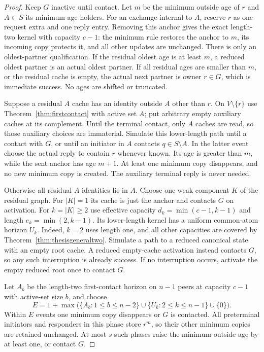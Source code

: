 \documentclass[11pt]{article}
\begin{document}
\begin{proof}
Keep $G$ inactive until contact. Let $m$ be the minimum
outside age of $r$ and $A\subset S$ its minimum-age holders.
For an exchange internal to $A$, reserve $r$ as one
request extra and one reply entry. Removing this anchor
gives the exact length-two kernel with capacity $c-1$:
the minimum rule restores the anchor to $m$, its incoming
copy protects it, and all other updates are unchanged.
There is only an oldest-partner qualification. If the
residual oldest age is at least $m$, a reduced oldest
partner is an actual oldest partner. If all residual
ages are smaller than $m$, or the residual cache is
empty, the actual next partner is owner $r\in G$,
which is immediate success. No ages are shifted or truncated.

Suppose a residual $A$ cache has an identity outside $A$
other than $r$. On $V\setminus\{r\}$ use
Theorem~\ref{thm:firstcontact} with active set $A$;
put arbitrary empty auxiliary caches at its complement.
Until the terminal contact, only $A$ caches are read,
so those auxiliary choices are immaterial. Simulate
this lower-length path until a contact with $G$, or
until an initiator in $A$ contacts $q\in S\setminus A$.
In the latter event choose the actual reply to contain
$r$ whenever known. Its age is greater than $m$, while
the sent anchor has age $m+1$. At least one minimum
copy disappears, and no new minimum copy is created.
The auxiliary terminal reply is never needed.

Otherwise all residual $A$ identities lie in $A$.
Choose one weak component $K$ of the residual graph.
For $|K|=1$ its cache is just the anchor and contacts
$G$ on activation. For $k=|K|\ge2$ use effective
capacity $d_k=\min(c-1,k-1)$ and length
$e_k=\min(2,k-1)$. Its lower-length kernel has a
uniform common-atom horizon $U_k$. Indeed, $k=2$
uses length one, and all other capacities are covered
by Theorem~\ref{thm:thesisgeneraltwo}.
Simulate a path to a reduced canonical
state with an empty root cache. A reduced empty-cache
activation instead contacts $G$, so any such interruption
is already success. If no interruption occurs, activate
the empty reduced root once to contact $G$.

Let $A_b$ be the length-two first-contact horizon on
$n-1$ peers at capacity $c-1$ with active-set size $b$,
and choose
\[
 E=1+\max\bigl(\{A_b:1\le b\le n-2\}
        \cup\{U_k:2\le k\le n-1\}\cup\{0\}\bigr).
\]
Within $E$ events one minimum copy disappears or $G$
is contacted. All preterminal initiators and responders
in this phase store $r^m$, so their other minimum copies
are retained unchanged. At most $s$ such phases raise
the minimum outside age by at least one, or contact $G$.


\end{proof}
\end{document}
